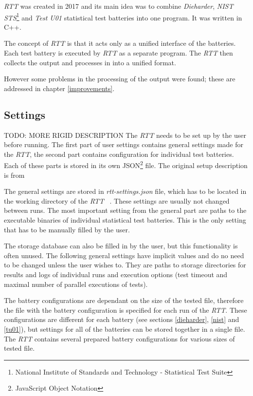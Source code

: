 \documentclass[
  digital,     %
  oneside,     %
  nosansbold,  %
  nocolorbold, %
  nolof,         %
  nolot,         %
]{fithesis4}
\begin{document}
\emph{RTT} was created in 2017 and its main idea was to combine \emph{Dieharder}, \emph{NIST STS}\footnote{National Institute of Standards and Technology - Statistical Test Suite} and \emph{Test U01} statistical test batteries into one program. It was written in C++. 

The concept of \emph{RTT} is that it acts only as a unified interface of the batteries. Each test battery is executed by \emph{RTT} as a separate program. The \emph{RTT} then collects the output and processes in into a unified format.~\cite[p.~8]{rtt-obratil}

However some problems in the processing of the output were found; these are addressed in chapter \ref{improvements}.

\subsection{Settings}\label{rtt-settings} 
TODO: MORE RIGID DESCRIPTION
The \emph{RTT} needs to be set up by the user before running. The first part of user settings contains general settings made for the \emph{RTT}, the second part contains configuration for individual test batteries. Each of these parts is stored in its own JSON\footnote{JavaScript Object Notation} file. The original setup description is from

The general settings are stored in \emph{rtt-settings.json} file, which has to be located in the working directory of the \emph{RTT}~\cite[p.~10]{rtt-obratil} . These settings are usually not changed between runs.
The most important setting from the general part are paths to the executable binaries of individual statistical test batteries. This is the only setting that has to be manually filled by the user.

The storage database can also be filled in by the user, but this functionality is often unused. The following general settings have implicit values and do no need to be changed unless the user wishes to. They are paths to storage directories for results and logs of individual runs and execution options (test timeout and maximal number of parallel executions of tests). 

 The battery configurations are dependant on the size of the tested file, therefore the file with the battery configuration is specified for each run of the \emph{RTT}. These configurations are different for each battery (see sections \ref{dieharder}, \ref{nist} and \ref{tu01}), but settings for all of the batteries can be stored together in a single file.~\cite[p.~11]{rtt-obratil}  The \emph{RTT} contains several prepared battery configurations for various sizes of tested file.
\end{document}
